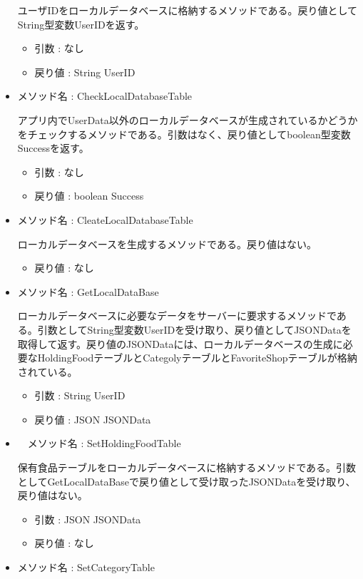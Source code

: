 \documentclass[a4j]{jarticle}
\begin{document}
\begin{itemize}
	ユーザIDをローカルデータベースに格納するメソッドである。戻り値としてString型変数UserIDを返す。
	\begin{itemize}
		\item 引数 : なし
		\item 戻り値 : String UserID
	\end{itemize}

	\item メソッド名 : CheckLocalDatabaseTable

	アプリ内でUserData以外のローカルデータベースが生成されているかどうかをチェックするメソッドである。引数はなく、戻り値としてboolean型変数Successを返す。
	\begin{itemize}
		\item 引数 : なし
		\item 戻り値 : boolean Success
	\end{itemize}

	\item メソッド名 : CleateLocalDatabaseTable

	ローカルデータベースを生成するメソッドである。戻り値はない。
	\begin{itemize}
		\item 戻り値 : なし
	\end{itemize}

	\item メソッド名 : GetLocalDataBase

	ローカルデータベースに必要なデータをサーバーに要求するメソッドである。引数としてString型変数UserIDを受け取り、戻り値としてJSONDataを取得して返す。戻り値のJSONDataには、ローカルデータベースの生成に必要なHoldingFoodテーブルとCategolyテーブルとFavoriteShopテーブルが格納されている。
	\begin{itemize}
		\item 引数 : String UserID
		\item 戻り値 : JSON JSONData
	\end{itemize}

	\item　メソッド名 : SetHoldingFoodTable

	保有食品テーブルをローカルデータベースに格納するメソッドである。引数としてGetLocalDataBaseで戻り値として受け取ったJSONDataを受け取り、戻り値はない。
	\begin{itemize}
		\item 引数 : JSON JSONData
		\item 戻り値 : なし
	\end{itemize}

	\item メソッド名 : SetCategoryTable


\end{itemize}
\end{document}
